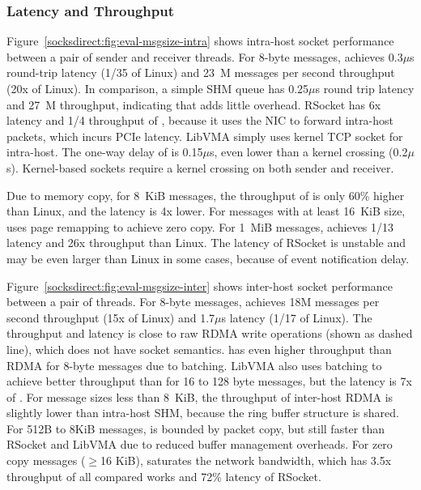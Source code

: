 \subsubsection{Latency and Throughput}
\quad



Figure~\ref{socksdirect:fig:eval-msgsize-intra} shows intra-host socket performance between a pair of sender and receiver threads.
For 8-byte messages, \sys achieves 0.3$\mu$s round-trip latency (1/35 of Linux) and 23~M messages per second throughput (20x of Linux).
In comparison, a simple SHM queue has 0.25$\mu$s round trip latency and 27~M throughput, indicating that \sys adds little overhead.
RSocket has 6x latency and 1/4 throughput of \sys{}, because it uses the NIC to forward intra-host packets, which incurs PCIe latency.
LibVMA simply uses kernel TCP socket for intra-host.
The one-way delay of \sys{} is 0.15$\mu$s, even lower than a kernel crossing (0.2$\mu$s). Kernel-based sockets require a kernel crossing on both sender and receiver.

Due to memory copy, for 8~KiB messages, the throughput of \sys is only 60\% higher than Linux, and the latency is 4x lower. For messages with at least 16~KiB size, \sys uses page remapping to achieve zero copy.
For 1~MiB messages, \sys achieves 1/13 latency and 26x throughput than Linux.
The latency of RSocket is unstable and may be even larger than Linux in some cases, because of event notification delay.


Figure~\ref{socksdirect:fig:eval-msgsize-inter} shows inter-host socket performance between a pair of threads.
For 8-byte messages, \sys achieves 18M messages per second throughput (15x of Linux) and 1.7$\mu$s latency (1/17 of Linux).
The throughput and latency is close to raw RDMA write operations (shown as dashed line), which does not have socket semantics.
\sys{} has even higher throughput than RDMA for 8-byte messages due to batching.
LibVMA also uses batching to achieve better throughput than \sys{} for 16 to 128 byte messages, but the latency is 7x of \sys{}.
For message sizes less than 8~KiB, the throughput of inter-host RDMA is  slightly lower than intra-host SHM, because the ring buffer structure is shared.
For 512B to 8KiB messages, \sys{} is bounded by packet copy, but still faster than RSocket and LibVMA due to reduced buffer management overheads.
For zero copy messages ($\ge$16 KiB), \sys{} saturates the network bandwidth, which has 3.5x throughput of all compared works and 72\% latency of RSocket.



